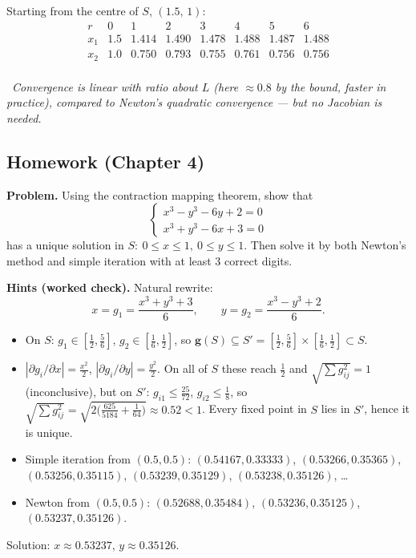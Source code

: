 \documentclass[hidelinks]{article}
\newcommand{\callout}[1]{\par\smallskip\noindent{\color{capri}$\blacktriangleright$}\ \textit{#1}\par\smallskip}
\newcommand{\abs}[1]{\left|#1\right|}
\begin{document}
Starting from the centre of $S$, $(1.5,\,1)$:
\[
\begin{array}{c|ccccccc}
r & 0 & 1 & 2 & 3 & 4 & 5 & 6\\ \hline
x_1 & 1.5 & 1.414 & 1.490 & 1.478 & 1.488 & 1.487 & 1.488\\
x_2 & 1.0 & 0.750 & 0.793 & 0.755 & 0.761 & 0.756 & 0.756\\
\end{array}
\]
\callout{Convergence is linear with ratio about $L$ (here $\approx0.8$ by the bound, faster in practice), compared to Newton's quadratic convergence --- but no Jacobian is needed.}

\subsection{Homework (Chapter 4)}

\textbf{Problem.} Using the contraction mapping theorem, show that
\[
\begin{cases}x^3-y^3-6y+2=0\\ x^3+y^3-6x+3=0\end{cases}
\]
has a unique solution in $S:\ 0\le x\le1,\ 0\le y\le1$. Then solve it by both Newton's method and simple iteration with at least 3 correct digits.

\textbf{Hints (worked check).} Natural rewrite:
\[
x=g_1=\frac{x^3+y^3+3}{6},\qquad y=g_2=\frac{x^3-y^3+2}{6}.
\]
\begin{itemize}
    \item On $S$: $g_1\in[\frac12,\frac56]$, $g_2\in[\frac16,\frac12]$, so $\mathbf g(S)\subseteq S'=[\frac12,\frac56]\times[\frac16,\frac12]\subset S$.
    \item $\abs{\partial g_i/\partial x}=\frac{x^2}{2}$, $\abs{\partial g_i/\partial y}=\frac{y^2}{2}$. On all of $S$ these reach $\frac12$ and $\sqrt{\sum g_{ij}^2}=1$ (inconclusive), but on $S'$: $g_{i1}\le\frac{25}{72}$, $g_{i2}\le\frac18$, so $\sqrt{\sum g_{ij}^2}=\sqrt{2\big(\frac{625}{5184}+\frac1{64}\big)}\approx0.52<1$. Every fixed point in $S$ lies in $S'$, hence it is unique.
    \item Simple iteration from $(0.5,0.5)$: $(0.54167,0.33333)$, $(0.53266,0.35365)$, $(0.53256,0.35115)$, $(0.53239,0.35129)$, $(0.53238,0.35126)$, \dots
    \item Newton from $(0.5,0.5)$: $(0.52688,0.35484)$, $(0.53236,0.35125)$, $(0.53237,0.35126)$.
\end{itemize}
Solution: $x\approx0.53237$, $y\approx0.35126$.
\end{document}
